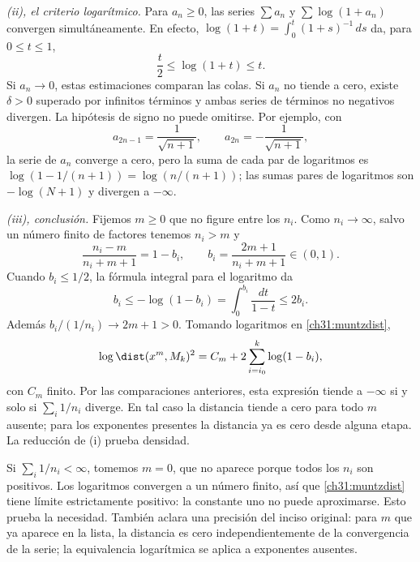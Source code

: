 \begin{solucion}
\emph{(ii), el criterio logarítmico.} Para $a_n\geq0$, las series $\sum a_n$ y $\sum\log(1+a_n)$ convergen simultáneamente. En efecto, $\log(1+t)=\int_0^t(1+s)^{-1}\,ds$ da, para $0\leq t\leq1$,
\[
 \frac t2\leq\log(1+t)\leq t.
\]
Si $a_n\to0$, estas estimaciones comparan las colas. Si $a_n$ no tiende a cero, existe $\delta>0$ superado por infinitos términos y ambas series de términos no negativos divergen. La hipótesis de signo no puede omitirse. Por ejemplo, con
\[
 a_{2n-1}=\frac1{\sqrt{n+1}},\qquad a_{2n}=-\frac1{\sqrt{n+1}},
\]
la serie de $a_n$ converge a cero, pero la suma de cada par de logaritmos es $\log(1-1/(n+1))=\log(n/(n+1))$; las sumas pares de logaritmos son $-\log(N+1)$ y divergen a $-\infty$.

\emph{(iii), conclusión.} Fijemos $m\geq0$ que no figure entre los $n_i$. Como $n_i\to\infty$, salvo un número finito de factores tenemos $n_i>m$ y
\[
 \frac{n_i-m}{n_i+m+1}=1-b_i,
 \qquad b_i=\frac{2m+1}{n_i+m+1}\in(0,1).
\]
Cuando $b_i\leq1/2$, la fórmula integral para el logaritmo da
\[
 b_i\leq-\log(1-b_i)=\int_0^{b_i}\frac{dt}{1-t}\leq2b_i.
\]
Además $b_i/(1/n_i)\to2m+1>0$. Tomando logaritmos en \eqref{ch31:muntzdist},
\[
 \log\dist(x^m,M_k)^2=C_m+2\sum_{i=i_0}^{k}\log(1-b_i),
\]
con $C_m$ finito. Por las comparaciones anteriores, esta expresión tiende a $-\infty$ si y solo si $\sum_i1/n_i$ diverge. En tal caso la distancia tiende a cero para todo $m$ ausente; para los exponentes presentes la distancia ya es cero desde alguna etapa. La reducción de (i) prueba densidad.

Si $\sum_i1/n_i<\infty$, tomemos $m=0$, que no aparece porque todos los $n_i$ son positivos. Los logaritmos convergen a un número finito, así que \eqref{ch31:muntzdist} tiene límite estrictamente positivo: la constante uno no puede aproximarse. Esto prueba la necesidad. También aclara una precisión del inciso original: para $m$ que ya aparece en la lista, la distancia es cero independientemente de la convergencia de la serie; la equivalencia logarítmica se aplica a exponentes ausentes.
\end{solucion}

